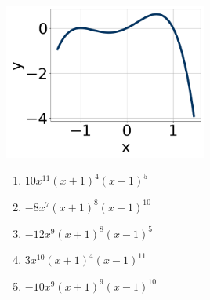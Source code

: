 \documentclass[14pt]{extbook}
\begin{document}
\begin{enumerate}
{\begin{center}
    \includegraphics[width=0.5\textwidth]{../Figures/polyGraphToFunctionA.png}
\end{center}
\begin{enumerate}[label=\Alph*.]
\item \( 10x^{11} (x + 1)^{4} (x - 1)^{5} \)
\item \( -8x^{7} (x + 1)^{8} (x - 1)^{10} \)
\item \( -12x^{9} (x + 1)^{8} (x - 1)^{5} \)
\item \( 3x^{10} (x + 1)^{4} (x - 1)^{11} \)
\item \( -10x^{9} (x + 1)^{9} (x - 1)^{10} \)

\end{enumerate} }
\end{enumerate}
\end{document}
